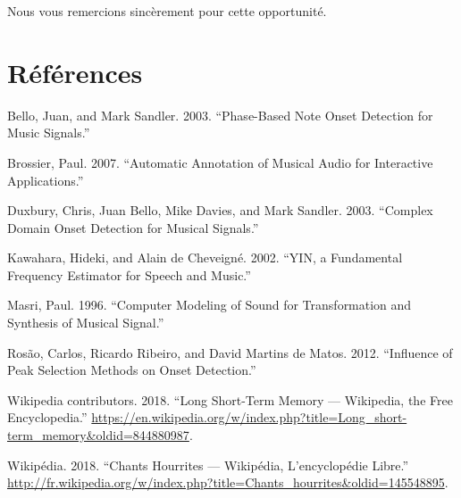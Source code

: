 \documentclass[]{article}
\begin{document}
Nous vous remercions sincèrement pour cette opportunité.

\pagebreak

\hypertarget{references}{%
\section*{Références}\label{references}}

\hypertarget{refs}{}
\leavevmode\hypertarget{ref-phase}{}%
Bello, Juan, and Mark Sandler. 2003. ``Phase-Based Note Onset Detection
for Music Signals.''

\leavevmode\hypertarget{ref-yinfft}{}%
Brossier, Paul. 2007. ``Automatic Annotation of Musical Audio for
Interactive Applications.''

\leavevmode\hypertarget{ref-complex}{}%
Duxbury, Chris, Juan Bello, Mike Davies, and Mark Sandler. 2003.
``Complex Domain Onset Detection for Musical Signals.''

\leavevmode\hypertarget{ref-yin}{}%
Kawahara, Hideki, and Alain de Cheveigné. 2002. ``YIN, a Fundamental
Frequency Estimator for Speech and Music.''

\leavevmode\hypertarget{ref-hfc}{}%
Masri, Paul. 1996. ``Computer Modeling of Sound for Transformation and
Synthesis of Musical Signal.''

\leavevmode\hypertarget{ref-ismir}{}%
Rosão, Carlos, Ricardo Ribeiro, and David Martins de Matos. 2012.
``Influence of Peak Selection Methods on Onset Detection.''

\leavevmode\hypertarget{ref-lstm}{}%
Wikipedia contributors. 2018. ``Long Short-Term Memory --- Wikipedia,
the Free Encyclopedia.''
\url{https://en.wikipedia.org/w/index.php?title=Long_short-term_memory\&oldid=844880987}.

\leavevmode\hypertarget{ref-ougarit}{}%
Wikipédia. 2018. ``Chants Hourrites --- Wikipédia, L'encyclopédie
Libre.''
\url{http://fr.wikipedia.org/w/index.php?title=Chants_hourrites\&oldid=145548895}.
\end{document}
